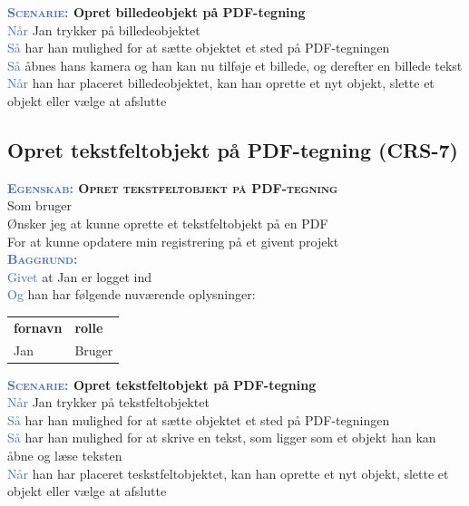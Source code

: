\textbf{\textsc{\textcolor{RoyalBlue}{Scenarie:}} Opret billedeobjekt på PDF-tegning}\\
\textcolor{RoyalBlue}{Når} Jan trykker på billedeobjektet\\
\textcolor{RoyalBlue}{Så}  har han mulighed for at sætte objektet et sted på PDF-tegningen\\
\textcolor{RoyalBlue}{Så}  åbnes hans kamera og han kan nu tilføje et billede, og derefter en billede tekst\\
\textcolor{RoyalBlue}{Når} han har placeret billedeobjektet, kan han oprette et nyt objekt, slette et objekt eller vælge at afslutte \\

\subsection{Opret tekstfeltobjekt på PDF-tegning (CRS-7)} \label{sec:USOpretTekstfelt}
\textbf{\textsc{\textcolor{RoyalBlue}{Egenskab:} Opret tekstfeltobjekt på PDF-tegning}}\\
Som bruger\\
Ønsker jeg at kunne oprette et tekstfeltobjekt på en PDF\\
For at kunne opdatere min registrering på et givent projekt \\

\textsc{\textcolor{RoyalBlue}{\textbf{Baggrund:}}}\\
\textcolor{RoyalBlue}{Givet} at Jan er logget ind\\
\textcolor{RoyalBlue}{Og} han har følgende nuværende oplysninger:\\
\begin{tabular}{| l | l |}
	\textbf{fornavn} & \textbf{rolle} \\
	Jan & Bruger\\
\end{tabular}

\textbf{\textsc{\textcolor{RoyalBlue}{Scenarie:}} Opret tekstfeltobjekt på PDF-tegning}\\
\textcolor{RoyalBlue}{Når} Jan trykker på tekstfeltobjektet\\
\textcolor{RoyalBlue}{Så}  har han mulighed for at sætte objektet et sted på PDF-tegningen\\
\textcolor{RoyalBlue}{Så}  har han mulighed for at skrive en tekst, som ligger som et objekt han kan åbne og læse teksten\\
\textcolor{RoyalBlue}{Når} han har placeret teskstfeltobjektet, kan han oprette et nyt objekt, slette et objekt eller vælge at afslutte \\

